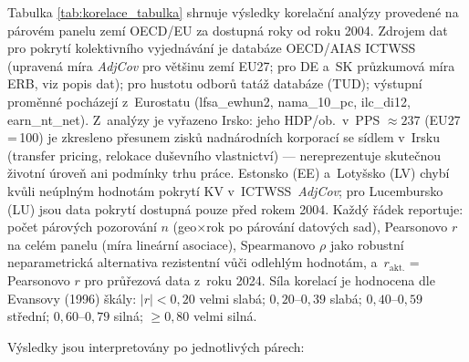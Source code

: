 Tabulka \ref{tab:korelace_tabulka} shrnuje výsledky korelační analýzy provedené na párovém panelu zemí OECD/\ac{EU} za dostupná roky od roku 2004.
Zdrojem dat pro pokrytí kolektivního vyjednávání je databáze OECD/AIAS ICTWSS (upravená míra \textit{AdjCov} pro většinu zemí EU27; pro DE a~SK průzkumová míra ERB, viz popis dat); pro hustotu odborů tatáž databáze (TUD); výstupní proměnné pocházejí z~Eurostatu (lfsa\_ewhun2, nama\_10\_pc, ilc\_di12, earn\_nt\_net).
Z~analýzy je vyřazeno Irsko: jeho \ac{HDP}/ob.~v~\acs{PPS} $\approx 237$ (\acs{EU}27\,=\,100) je zkresleno přesunem zisků nadnárodních korporací se sídlem v~Irsku (transfer pricing, relokace duševního vlastnictví) --- nereprezentuje skutečnou životní úroveň ani podmínky trhu práce.
Estonsko (EE) a~Lotyšsko (LV) chybí kvůli neúplným hodnotám pokrytí \acs{KV} v~ICTWSS~\textit{AdjCov}; pro Lucembursko (LU) jsou data pokrytí dostupná pouze před rokem 2004.
Každý řádek reportuje: počet párových pozorování $n$ (geo$\times$rok po párování datových sad), Pearsonovo $r$ na celém panelu (míra lineární asociace), Spearmanovo $\rho$ jako robustní neparametrická alternativa rezistentní vůči odlehlým hodnotám, a~$r_{\text{akt.}}$ = Pearsonovo $r$ pro průřezová data z~roku 2024.
Síla korelací je hodnocena dle Evansovy (1996) škály: $|r| < 0{,}20$ velmi slabá; $0{,}20$--$0{,}39$ slabá; $0{,}40$--$0{,}59$ střední; $0{,}60$--$0{,}79$ silná; $\geq 0{,}80$ velmi silná.

Výsledky jsou interpretovány po jednotlivých párech:

